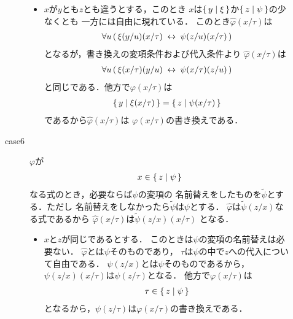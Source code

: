 \begin{metaprf}[第一]
\begin{description}
\begin{description}
\begin{itemize}
							\item $x$が$y$とも$z$とも違うとする，このとき
								$x$は$\{\, y \mid \xi\, \}$か$\{\, z \mid \psi\, \}$の少なくとも
								一方には自由に現れている．
								このとき$\widehat{\varphi}(x/\tau)$は
								\begin{align}
									\forall u\, (\, \xi(y/u)(x/\tau) \hspace{0.25em}\leftrightarrow\hspace{0.25em} \psi(z/u)(x/\tau)\, )
								\end{align}
								となるが，書き換えの変項条件および代入条件より
								$\widehat{\varphi}(x/\tau)$は
								\begin{align}
									\forall u\, (\, \xi(x/\tau)(y/u) \hspace{0.25em}\leftrightarrow\hspace{0.25em} \psi(x/\tau)(z/u)\, )
								\end{align}
								と同じである．他方で$\varphi(x/\tau)$は
								\begin{align}
									\{\, y \mid \xi(x/\tau)\, \} = \{\, z \mid \psi(x/\tau)\, \}
								\end{align}
								であるから$\widehat{\varphi}(x/\tau)$は
								$\varphi(x/\tau)$の書き換えである．
						\end{itemize}
						
					\item[case6] $\varphi$が
						\begin{align}
							x \in \{\, z \mid \psi\, \}
						\end{align}
						なる式のとき，必要ならば$\psi$の変項の
						名前替えをしたものを$\widetilde{\psi}$とする．ただし
						名前替えをしなかったら$\widetilde{\psi}$は$\psi$とする．
						$\widehat{\varphi}$は$\widetilde{\psi}(z/x)$なる式であるから
						$\widehat{\varphi}(x/\tau)$は$\widetilde{\psi}(z/x)(x/\tau)$
						となる．
						\begin{itemize}
							\item $x$と$z$が同じであるとする．
								このときは$\psi$の変項の名前替えは必要ない．
								$\widehat{\varphi}$とは$\psi$そのものであり，
								$\tau$は$\psi$の中で$z$への代入について自由である．
								$\psi(z/x)$とは$\psi$そのものであるから，
								$\psi(z/x)(x/\tau)$は$\psi(z/\tau)$となる．
								他方で$\varphi(x/\tau)$は
								\begin{align}
									\tau \in \{\, z \mid \psi\, \}
								\end{align}
								となるから，$\psi(z/\tau)$は$\varphi(x/\tau)$の書き換えである．
								

\end{itemize}
\end{description}
\end{description}
\end{metaprf}
